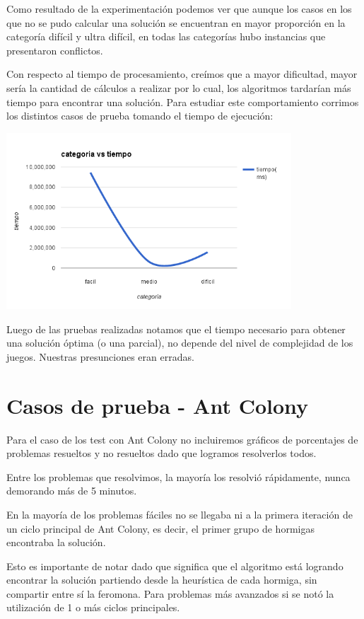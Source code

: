 \documentclass[a4paper,spanish]{article}
\begin{document}
Como resultado de la experimentación podemos ver que aunque los casos en los que no se pudo
calcular una solución se encuentran en mayor proporción en la categoría difícil y ultra difícil, en todas las
categorías hubo instancias que presentaron conflictos.

Con respecto al tiempo de procesamiento, creímos que a mayor dificultad, mayor sería la
cantidad de cálculos a realizar por lo cual, los algoritmos tardarían más tiempo para encontrar
una solución. Para estudiar este comportamiento corrimos los distintos casos de prueba tomando
el tiempo de ejecución:

\begin{center}
	\includegraphics[width=0.8\textwidth]{./graficos/categoriaVsTiempo.png}
\end{center}

Luego de las pruebas realizadas notamos que el tiempo necesario para obtener una solución
óptima (o una parcial), no depende del nivel de complejidad de los juegos.
Nuestras presunciones eran erradas.

\section{Casos de prueba - Ant Colony}

Para el caso de los test con Ant Colony no incluiremos gráficos de porcentajes de problemas resueltos y
no resueltos dado que logramos resolverlos todos.

Entre los problemas que resolvimos, la mayoría los resolvió rápidamente, nunca demorando más de 5 minutos.

En la mayoría de los problemas fáciles no se llegaba ni a la primera iteración de un ciclo
principal de Ant Colony, es decir, el primer grupo de hormigas encontraba la solución.

Esto es importante de notar dado que significa que el algoritmo está logrando encontrar la solución 
partiendo desde la heurística de cada hormiga, sin compartir entre sí la feromona.
Para problemas más avanzados si se notó la utilización de 1 o más ciclos principales.
\end{document}
